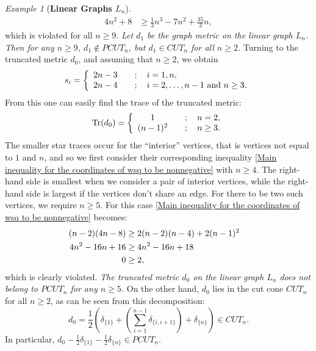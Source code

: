 \documentclass[12pt]{amsart}
\numberwithin{theorem}{section}
\theoremstyle{remark}
\newtheorem{example}[theorem]{Example}
\begin{document}
\begin{example}[{\bf Linear Graphs $L_n$}]
\begin{align*}
4n^2 +8 & \ge \textstyle \frac{1}{3}n^3-7n^2+\frac{35}{3}n,  
\end{align*}
which is violated for all $n\ge 9$. 
\vskip2mm
 {\em Let $d_1$ be the graph metric on the linear graph $L_n$. Then for any $n\ge 9$, $d_1\notin PCUT_n$, but $d_1\in CUT_n$ for all $n\ge 2$. } 
\vskip3mm
Turning to the truncated metric $d_0$, and assuming that $n\ge 2$, we obtain 
$$s_i = \left\{ 
\begin{array}{cl}
2n-3 & \quad ; \quad i=1,n, \cr
2n-4 & \quad ; \quad i=2,\dots, n-1 \text{ and } n\ge 3. 
\end{array} 
\right.   
$$
From this one can easily find the trace of the truncated metric: 
$$\text{Tr}(d_0) = \left\{
\begin{array}{cl}
1 & \quad ; \quad n=2, \cr
(n-1)^2 & \quad ; \quad n\ge 3. 
\end{array}
\right.
$$
The smaller star traces occur for the ``interior'' vertices, that is vertices not equal to $1$ and $n$, and so we first consider their corresponding inequality \eqref{Main inequality for the coordinates of wsq to be nonnegative} with $n\ge 4$. The right-hand side is smallest when we consider a pair of interior vertices, while the right-hand side is largest if the vertices don't share an edge. For there to be two such vertices, we require $n\ge 5$. For this case \eqref{Main inequality for the coordinates of wsq to be nonnegative} becomes:
\begin{align*}
(n-2)(4n-8) & \ge 2(n-2)(n-4)+ 2(n-1)^2  \cr
4n^2-16n +16 & \ge 4n^2-16n + 18  \cr
0 & \ge 2,   \cr
\end{align*}
which is clearly violated.  
\vskip2mm
 {\em The truncated metric $d_0$ on the linear graph $L_n$ does not belong to $PCUT_n$ for any $n\ge 5$.}
\vskip2mm
On the other hand, $d_0$ lies in the cut cone $CUT_n$ for all $n\ge 2$, as can be seen from this decomposition:
$$d_0 = \frac{1}{2}\left( \delta_{\{1\}} + \left(\sum_{i=1}^{n-1} \delta_{\{i,i+1\}} \right) + \delta_{\{n\}}\right) \in CUT_n.$$
In particular, $d_ 0 - \frac{1}{2}\delta_{\{1\}}-\frac{1}{2}\delta_{\{n\}}\in PCUT_n$. 
\end{example} 
\end{document}
